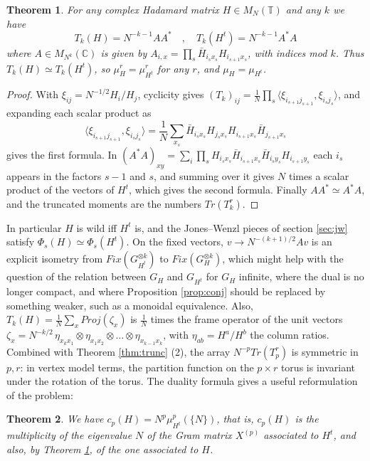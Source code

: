 \documentclass[11pt]{amsart}
\newtheorem{theorem}{Theorem}[section]
\newcommand{\T}{\mathbb T}
\begin{document}
\begin{theorem}\label{thm:transp}
For any complex Hadamard matrix $H\in M_N(\T)$ and any $k$ we have
$$T_k(H)=N^{-k-1}AA^*\quad,\quad T_k(H^t)=N^{-k-1}A^*A$$
where $A\in M_{N^k}(\mathbb C)$ is given by $A_{i,x}=\prod_s\bar{H}_{i_sx_s}H_{i_{s+1}x_s}$, with indices mod $k$. Thus $T_k(H)\simeq T_k(H^t)$, so $\mu^r_H=\mu^r_{H^t}$ for any $r$, and $\mu_H=\mu_{H^t}$.
\end{theorem}

\begin{proof}
With $\xi_{ij}=N^{-1/2}H_i/H_j$, cyclicity gives $(T_k)_{ij}=\frac{1}{N}\prod_s\langle\xi_{i_{s+1}j_{s+1}},\xi_{i_sj_s}\rangle$, and expanding each scalar product as
$$\langle\xi_{i_{s+1}j_{s+1}},\xi_{i_sj_s}\rangle=\frac{1}{N}\sum_{x_s}\bar{H}_{i_sx_s}H_{j_sx_s}H_{i_{s+1}x_s}\bar{H}_{j_{s+1}x_s}$$
gives the first formula. In $(A^*A)_{xy}=\sum_i\prod_sH_{i_sx_s}\bar{H}_{i_{s+1}x_s}\bar{H}_{i_sy_s}H_{i_{s+1}y_s}$ each $i_s$ appears in the factors $s-1$ and $s$, and summing over it gives $N$ times a scalar product of the vectors of $H^t$, which gives the second formula. Finally $AA^*\simeq A^*A$, and the truncated moments are the numbers $Tr(T_k^r)$.
\end{proof}

In particular $H$ is wild iff $H^t$ is, and the Jones--Wenzl pieces of section \ref{sec:jw} satisfy $\Phi_s(H)\simeq\Phi_s(H^t)$. On the fixed vectors, $v\to N^{-(k+1)/2}Av$ is an explicit isometry from $Fix(G_{H^t}^{\otimes k})$ to $Fix(G_H^{\otimes k})$, which might help with the question of the relation between $G_H$ and $G_{H^t}$ for $G_H$ infinite, where the dual is no longer compact, and where Proposition \ref{prop:conj} should be replaced by something weaker, such as a monoidal equivalence. Also, $T_k(H)=\frac{1}{N}\sum_xProj(\zeta_x)$ is $\frac{1}{N}$ times the frame operator of the unit vectors $\zeta_x=N^{-k/2}\,\eta_{x_kx_1}\otimes\eta_{x_1x_2}\otimes\ldots\otimes\eta_{x_{k-1}x_k}$, with $\eta_{ab}=H^a/H^b$ the column ratios. Combined with Theorem \ref{thm:trunc} (2), the array $N^{-p}Tr(T_p^r)$ is symmetric in $p,r$: in vertex model terms, the partition function on the $p\times r$ torus is invariant under the rotation of the torus. The duality formula gives a useful reformulation of the problem:

\begin{theorem}\label{thm:gram}
We have $c_p(H)=N^p\mu^p_{H^t}(\{N\})$, that is, $c_p(H)$ is the multiplicity of the eigenvalue $N$ of the Gram matrix $X^{(p)}$ associated to $H^t$, and also, by Theorem \ref{thm:transp}, of the one associated to $H$.
\end{theorem}
\end{document}
